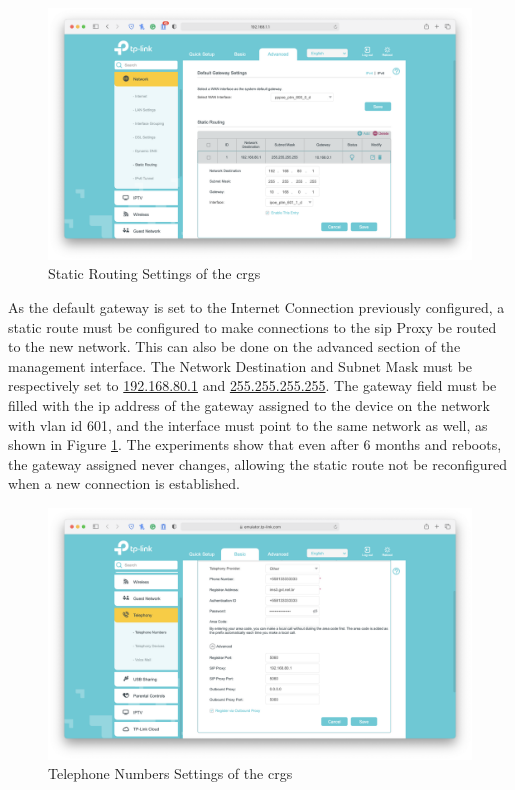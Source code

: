 \begin{figure}[h]
    \centering
    \includegraphics[width=\linewidth]{contents/substituting-the-isp-cpe/voip/advanced-network-staticrouting.png}
    \caption{Static Routing Settings of the \gls{crg}s}
    \label{figure:crgs_staticrouting}
\end{figure}

As the default gateway is set to the Internet Connection previously configured, a static route must be configured to make connections to the \gls{sip} Proxy be routed to the new network. This can also be done on the advanced section of the management interface. The Network Destination and Subnet Mask must be respectively set to \url{192.168.80.1} and \url{255.255.255.255}. The gateway field must be filled with the \gls{ip} address of the gateway assigned to the device on the network with \gls{vlan} \gls{id} 601, and the interface must point to the same network as well, as shown in Figure \ref{figure:crgs_staticrouting}. The experiments show that even after 6 months and reboots, the gateway assigned never changes, allowing the static route not be reconfigured when a new connection is established.

\begin{figure}[h]
    \centering
    \includegraphics[width=\linewidth]{contents/substituting-the-isp-cpe/voip/basic-telephony-telephonenumbers.png}
    \caption{Telephone Numbers Settings of the \gls{crg}s}
    \label{figure:crgs_telephonenumbers}
\end{figure}

